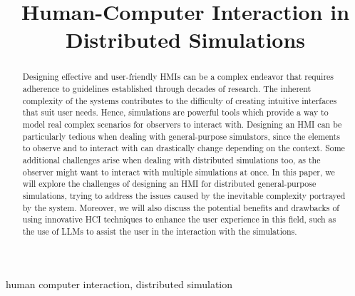 \documentclass[conference]{IEEEtran}
\begin{document}
\title{Human-Computer Interaction in Distributed Simulations\\
}

\author{
}

\maketitle

\begin{abstract}
    Designing effective and user-friendly \acp{HMI} can be a complex endeavor that requires adherence to guidelines
    established through decades of research.
    The inherent complexity of the systems contributes to the difficulty of creating intuitive interfaces that suit user needs.
    Hence,
    simulations are powerful tools which provide a way to model real complex scenarios for observers to interact with.
    Designing an \ac{HMI} can be particularly tedious when dealing with general-purpose simulators,
    since the elements to observe and to interact with can drastically change depending on the context.
    Some additional challenges arise when dealing with distributed simulations too,
    as the observer might want to interact with multiple simulations at once.
    In this paper,
    we will explore the challenges of designing an \ac{HMI} for distributed general-purpose simulations,
    trying to address the issues caused by the inevitable complexity portrayed by the system.
    Moreover,
    we will also discuss the potential benefits and drawbacks of using innovative \ac{HCI} techniques to enhance the user experience in this field,
    such as the use of \acp{LLM} to assist the user in the interaction with the simulations.
\end{abstract}

\begin{IEEEkeywords}
    human computer interaction, distributed simulation
\end{IEEEkeywords}
\end{document}
